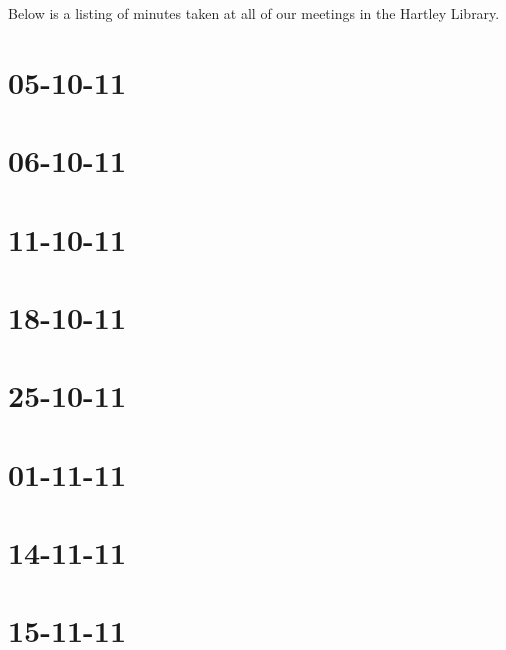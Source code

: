 
Below is a listing of minutes taken at all of our meetings in the Hartley Library.

\section{05-10-11}

\section{06-10-11}

\section{11-10-11}

\section{18-10-11}

\section{25-10-11}

\section{01-11-11}

\section{14-11-11}

\section{15-11-11}


